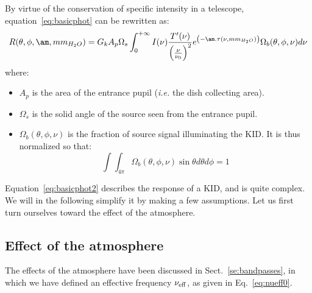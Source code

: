 By virtue of the conservation of specific intensity in a telescope,
equation~\ref{eq:basicphot} can be rewritten as:
\begin{equation}
R(\theta, \phi, \am, mm_{H_{2}O}) = G_{k} A_{p}\Omega_{s}\int_{0}^{+\infty} I(\nu)
\frac{T'(\nu)}{\left(\frac{\nu}{\nu_{0}}\right)^{2}} e^{\left(-\am
  . \tau(\nu,  mm_{H_{2}O})\right)} \Omega_{b} (\theta, \phi, \nu)  d\nu 
\label{eq:basicphot2}
\end{equation}
where:
\begin{itemize}
\item $A_{p}$ is the area of the entrance pupil ({\it i.e.} the
  dish collecting area).
\item $\Omega_{s}$ is the solid angle of the source seen from the
  entrance pupil.
\item $\Omega_{b}(\theta, \phi, \nu)$ is the fraction of source signal
  illuminating the KID. It is thus normalized so that:
\begin{equation}
\int\int_{4\pi} \Omega_{b}(\theta, \phi, \nu) \sin \theta d\theta
d\phi = 1 
\label{eq:omegabdef}
\end{equation}
\end{itemize}

Equation~\ref{eq:basicphot2} describes the response of a KID, and  
is quite complex. We will in the following simplify it by making a few
assumptions. Let us first turn ourselves toward the effect of the
atmosphere. 


\subsection{Effect of the atmosphere}

The effects of the atmosphere have been discussed in
Sect.~\ref{se:bandpasses}, in which we have defined an
effective frequency $\nu_{\rm{eff}}$, as given in
Eq.~\ref{eq:nueff0}. 


